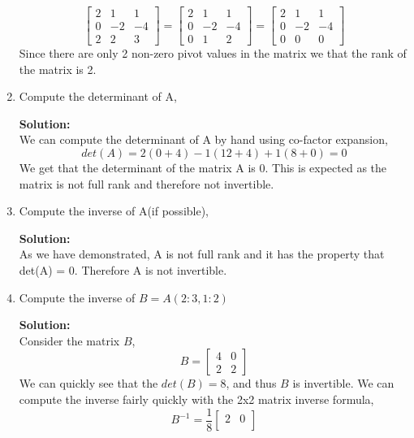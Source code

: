 \documentclass[12pt]{article}
\makeatletter
\theoremstyle{homework}
\newenvironment{exercise}[1]
{\def\@currentlabel{#1}\exercisecore}
{\endexercisecore}
\newcommand{\localhead}[1]{\par\smallskip\noindent\textbf{#1}\nobreak\\}%
\newcommand\solution{\localhead{Solution:}}
\makeatother
\begin{document}
\begin{exercise}{1}
\begin{enumerate}
\begin{equation*}
\begin{bmatrix}
            2& 1& 1 \\
            0 & -2 & -4 \\
            2 & 2 & 3 
        \end{bmatrix} = 
        \begin{bmatrix}
            2& 1& 1 \\
            0 & -2 & -4 \\
            0 & 1 & 2
        \end{bmatrix} = 
        \begin{bmatrix}
            2& 1& 1 \\
            0 & -2 & -4 \\
            0 & 0 & 0
        \end{bmatrix}
    \end{equation*}
    Since there are only 2 non-zero pivot values in the matrix we that the rank of the matrix is 2. 
    \vspace{.25in}
    \item Compute the determinant of A,
    \solution We can compute the determinant of A by hand using co-factor expansion, 
    \begin{equation*}
        det(A) = 2(0+4)-1(12+4)+1(8+0) = 0  
    \end{equation*} 
    We get that the determinant of the matrix A is 0. This is expected as the matrix is not full rank and therefore not invertible. 
    \vspace{.25in}
    \item Compute the inverse of A(if possible),
    \solution As we have demonstrated, A is not full rank and it has the property that det(A) = 0. Therefore A is not invertible.
    \vspace{.25in}
    \item Compute the inverse of $B = A(2:3, 1:2)$
    \solution Consider the matrix $B$, 
    \begin{equation*}
        B =  \begin{bmatrix}
            4& 0 \\
            2 & 2 
         \end{bmatrix}
     \end{equation*}
     We can quickly see that the $det(B) = 8$, and thus $B$ is invertible. We can compute the inverse fairly quickly with the 2x2 matrix inverse formula, 
     \begin{equation*}
         B^{-1} = \frac{1}{8} 
         \begin{bmatrix}
            2& 0 \\

\end{bmatrix}
\end{equation*}
\end{enumerate}
\end{exercise}
\end{document}
